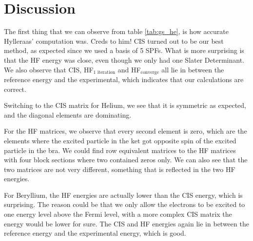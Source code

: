 \section{Discussion} \label{sec:discussion}
The first thing that we can observe from table \eqref{tab:gs_he}, is how accurate Hylleraas' computation was. Creds to him! CIS turned out to be our best method, as expected since we used a basis of 5 SPFs. What is more surprising is that the HF energy was close, even though we only had one Slater Determinant. We also observe that CIS, HF$_{\text{1 iteration}}$ and HF$_{\text{converge}}$ all lie in between the reference energy and the experimental, which indicates that our calculations are correct. 

Switching to the CIS matrix for Helium, we see that it is symmetric as expected, and the diagonal elements are dominating. 

For the HF matrices, we observe that every second element is zero, which are the elements where the excited particle in the ket got opposite spin of the excited particle in the bra. We could find row equivalent matrices to the HF matrices with four block sections where two contained zeros only. We can also see that the two matrices are not very different, something that is reflected in the two HF energies.

For Beryllium, the HF energies are actually lower than the CIS energy, which is surprising. The reason could be that we only allow the electrons to be excited to one energy level above the Fermi level, with a more complex CIS matrix the energy would be lower for sure. The CIS and HF energies again lie in between the reference energy and the experimental energy, which is good. 